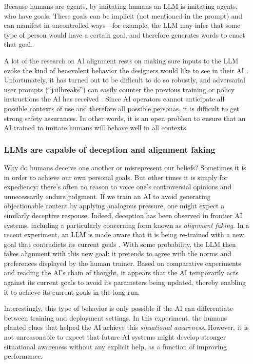 Because humans are agents, by imitating humans an LLM is imitating agents, who have goals. These goals can be implicit (not mentioned in the prompt) and can manifest in uncontrolled ways---for example, the LLM may infer that some type of person would have a certain goal, and therefore generates words to enact that goal.

A lot of the research on AI alignment rests on making sure inputs to the LLM evoke the kind of benevolent behavior the designers would like to see in their AI \cite{arxiv.org.abs.2212.08073}. Unfortunately, it has turned out to be difficult to do so robustly, and adversarial user prompts (``jailbreaks'') can easily counter the previous training or policy instructions the AI has received \cite{arxiv.org.abs.2307.15043}. Since AI operators cannot anticipate all possible contexts of use and therefore all possible personas, it is difficult to get strong safety assurances. In other words, it is an open problem to ensure that an AI trained to imitate humans will behave well in all contexts. 
    \subsubsection{LLMs are capable of deception and alignment faking}
    \label{sec:existential:misagencyimitation:humandeception}

Why do humans deceive one another or misrepresent our beliefs? Sometimes it is in order to achieve our own personal goals. But other times it is simply for expediency: there's often no reason to voice one's controversial opinions and unnecessarily endure judgment. 
If we train an AI to avoid generating objectionable content by applying analogous pressure, one might expect a similarly deceptive response.
Indeed, deception has been observed in frontier AI systems, including a particularly concerning form known as \textit{alignment faking}. In a recent experiment, an LLM is made aware that it is being re-trained with a new goal that contradicts its current goals \cite{arxiv.org.abs.2412.14093}. With some probability, the LLM then fakes alignment with this new goal: it pretends to agree with the norms and preferences displayed by the human trainer. Based on comparative experiments and reading the AI's chain of thought, it appears that the AI temporarily acts against its current goals to avoid its parameters being updated, thereby enabling it to achieve its current goals in the long run.

Interestingly, this type of behavior is only possible if the AI can differentiate between training and deployment settings. In this experiment, the humans planted clues that helped the AI achieve this \textit{situational awareness}. However, it is not unreasonable to expect that future AI systems might develop stronger situational awareness without any explicit help, as a function of improving performance.

